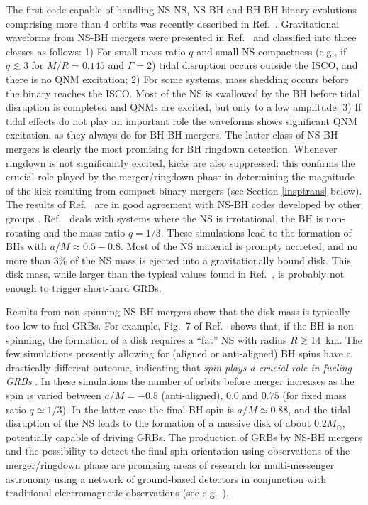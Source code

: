 \documentclass[]{iopart}
\begin{document}
The first code capable of handling NS-NS, NS-BH and BH-BH binary evolutions
comprising more than 4 orbits was recently described in
Ref.~\cite{Yamamoto:2008js}.  Gravitational waveforms from NS-BH mergers were
presented in Ref.~\cite{Shibata:2009cn} and classified into three classes as follows: 1)
For small mass ratio $q$ and small NS compactness (e.g., if $q\lesssim 3$ for
$M/R=0.145$ and $\Gamma=2$) tidal disruption occurs outside the ISCO, and
there is no QNM excitation; 2) For some systems, mass shedding occurs before
the binary reaches the ISCO. Most of the NS is swallowed by the BH before
tidal disruption is completed and QNMs are excited, but only to a low
amplitude; 3) If tidal effects do not play an important role the waveforms
shows significant QNM excitation, as they always do for BH-BH mergers. The
latter class of NS-BH mergers is clearly the most promising for BH ringdown
detection. Whenever ringdown is not significantly excited, kicks are also
suppressed: this confirms the crucial role played by the merger/ringdown phase
in determining the magnitude of the kick resulting from compact binary mergers
(see Section \ref{insptrans} below). The results of Ref.~\cite{Shibata:2009cn}
are in good agreement with NS-BH codes developed by other groups
\cite{Etienne:2007jg,Etienne:2008re,Duez:2008rb}. Ref.~\cite{Etienne:2007jg}
deals with systems where the NS is irrotational, the BH is non-rotating and
the mass ratio $q=1/3$. These simulations lead to the formation of BHs with
$a/M\approx 0.5-0.8$. Most of the NS material is prompty accreted, and no more
than 3\% of the NS mass is ejected into a gravitationally bound disk. This
disk mass, while larger than the typical values found in
Ref.~\cite{Shibata:2009cn}, is probably not enough to trigger short-hard GRBs.

Results from non-spinning NS-BH mergers show that the disk mass is typically
too low to fuel GRBs. For example, Fig.~7 of Ref.~\cite{Shibata:2009cn} shows
that, if the BH is non-spinning, the formation of a disk requires a ``fat'' NS
with radius $R\gtrsim 14$~km. The few simulations presently allowing for
(aligned or anti-aligned) BH spins have a drastically different outcome,
indicating that {\em spin plays a crucial role in fueling GRBs}
\cite{Etienne:2008re}. In these simulations the number of orbits before merger
increases as the spin is varied between $a/M=-0.5$ (anti-aligned), $0.0$ and
$0.75$ (for fixed mass ratio $q\simeq 1/3$). In the latter case the final BH
spin is $a/M\simeq 0.88$, and the tidal disruption of the NS leads to the
formation of a massive disk of about $0.2M_\odot$, potentially capable of
driving GRBs. The production of GRBs by NS-BH mergers and the possibility to
detect the final spin orientation using observations of the merger/ringdown
phase are promising areas of research for multi-messenger astronomy using a
network of ground-based detectors in conjunction with traditional
electromagnetic observations (see e.g.~\cite{Cutler:1994ys,Seto:2005xb,
  Kanner:2008zh,Bloom:2009vx,Nissanke:2009kt}).
\end{document}
